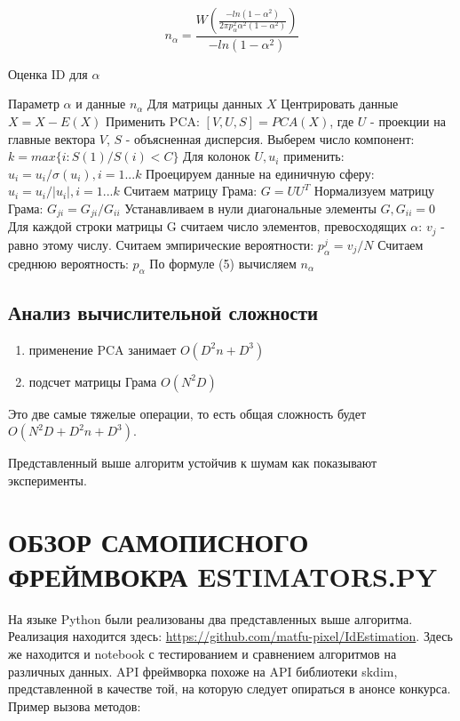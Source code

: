 \documentclass[english, russian]{sobraep}
\begin{document}
\begin{equation}
    n_\alpha = \frac{W(\frac{-ln(1 - \alpha^2)}{2\pi p_\alpha^2\alpha^2(1-\alpha^2)})}{-ln(1 - \alpha^2)}
\end{equation}

\begin{algorithm}
\caption{Оценка ID для $\alpha$}\label{alg:cap}
\begin{algorithmic}[1]
\Require Параметр $\alpha$ и данные
\Ensure $n_\alpha$
\State Для матрицы данных $X$
\State Центрировать данные $X = X - E(X)$
\State Применить PCA: $[V,U,S] = PCA(X)$, где $U$ - проекции на главные вектора $V$, $S$ - объясненная дисперсия.
\State Выберем число компонент: $k = max\{i: S(1)/S(i) < C\}$
\State Для колонок $U, u_i$ применить: $u_i = u_i / \sigma(u_i), i = 1...k$
\State Проецируем данные на единичную сферу: $u_i = u_i / |u_i|, i=1...k$
\State Считаем матрицу Грама: $G = UU^T$
\State Нормализуем матрицу Грама: $G_{ji} = G_{ji} / G_{ii}$
\State Устанавливаем в нули диагональные элементы $G, G_{ii} = 0$
\State Для каждой строки матрицы G считаем число элементов, превосходящих $\alpha$: $v_j$ - равно этому числу.
\State Считаем эмпирические вероятности:
$p_\alpha^j = v_j / N$
\State Считаем среднюю вероятность: $p_\alpha$
\State По формуле (5) вычисляем $n_\alpha$
\end{algorithmic}
\end{algorithm}

\subsection{Анализ вычислительной сложности}
\begin{enumerate}
    \item применение PCA занимает $O(D^2n+D^3)$
    \item подсчет матрицы Грама $O(N^2D)$
\end{enumerate}
Это две самые тяжелые операции, то есть общая сложность будет $O(N^2D + D^2n + D^3)$.

Представленный выше алгоритм устойчив к шумам как показывают эксперименты.

\section{ОБЗОР САМОПИСНОГО ФРЕЙМВОКРА ESTIMATORS.PY}
На языке Python были реализованы два представленных выше алгоритма. Реализация находится здесь: \url{https://github.com/matfu-pixel/IdEstimation}. Здесь же находится и notebook с тестированием и сравнением алгоритмов на различных данных. API фреймворка похоже на API библиотеки skdim, представленной в качестве той, на которую следует опираться в анонсе конкурса.
Пример вызова методов:
\end{document}
